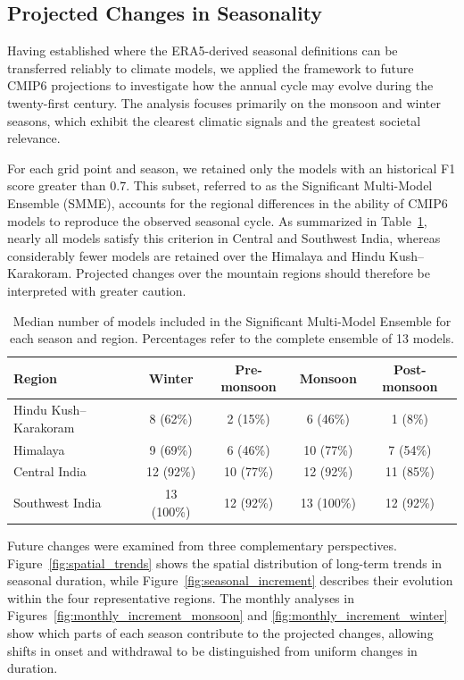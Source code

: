 \subsection{Projected Changes in Seasonality}

Having established where the ERA5-derived seasonal definitions can be transferred reliably to climate models, we applied the framework to future CMIP6 projections to investigate how the annual cycle may evolve during the twenty-first century. The analysis focuses primarily on the monsoon and winter seasons, which exhibit the clearest climatic signals and the greatest societal relevance. 

For each grid point and season, we retained only the models with an historical F1 score greater than $0.7$. This subset, referred to as the Significant Multi-Model Ensemble (SMME), accounts for the regional differences in the ability of CMIP6 models to reproduce the observed seasonal cycle. As summarized in Table~\ref{tab:smme_median_percentage}, nearly all models satisfy this criterion in Central and Southwest India, whereas considerably fewer models are retained over the Himalaya and Hindu Kush--Karakoram. Projected changes over the mountain regions should therefore be interpreted with greater caution.

\begin{table}[H]
\centering
\caption{Median number of models included in the Significant Multi-Model Ensemble for each season and region. Percentages refer to the complete ensemble of 13 models.}
\begin{tabular}{lcccc}
\hline
\textbf{Region} & \textbf{Winter} & \textbf{Pre-monsoon} & \textbf{Monsoon} & \textbf{Post-monsoon} \\
\hline
Hindu Kush--Karakoram & 8 (62\%) & 2 (15\%) & 6 (46\%) & 1 (8\%) \\
Himalaya              & 9 (69\%) & 6 (46\%) & 10 (77\%) & 7 (54\%) \\
Central India         & 12 (92\%) & 10 (77\%) & 12 (92\%) & 11 (85\%) \\
Southwest India       & 13 (100\%) & 12 (92\%) & 13 (100\%) & 12 (92\%) \\
\hline
\end{tabular}
\label{tab:smme_median_percentage}
\end{table}

Future changes were examined from three complementary perspectives. Figure~\ref{fig:spatial_trends} shows the spatial distribution of long-term trends in seasonal duration, while Figure~\ref{fig:seasonal_increment} describes their evolution within the four representative regions. The monthly analyses in Figures~\ref{fig:monthly_increment_monsoon} and \ref{fig:monthly_increment_winter} show which parts of each season contribute to the projected changes, allowing shifts in onset and withdrawal to be distinguished from uniform changes in duration.

